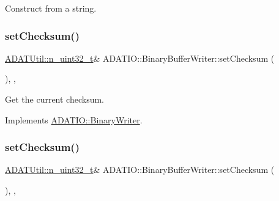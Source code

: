 Construct from a string. 

\mbox{\label{classADATIO_1_1BinaryBufferWriter_af4cc523a862ce29a96f1a813f254360e}} 
\subsubsection{\texorpdfstring{setChecksum()}{setChecksum()}\hspace{0.1cm}{\footnotesize\ttfamily [1/2]}}
{\footnotesize\ttfamily \mbox{\hyperlink{namespaceADATUtil_ad945a8afa4db2d1f89b731964adae97e}{A\+D\+A\+T\+Util\+::n\+\_\+uint32\+\_\+t}}\& A\+D\+A\+T\+I\+O\+::\+Binary\+Buffer\+Writer\+::set\+Checksum (\begin{DoxyParamCaption}{ }\end{DoxyParamCaption})\hspace{0.3cm}{\ttfamily [inline]}, {\ttfamily [protected]}, {\ttfamily [virtual]}}



Get the current checksum. 



Implements \mbox{\hyperlink{classADATIO_1_1BinaryWriter_ae64230370824192d1f0dbcaa8e74017a}{A\+D\+A\+T\+I\+O\+::\+Binary\+Writer}}.

\mbox{\label{classADATIO_1_1BinaryBufferWriter_af4cc523a862ce29a96f1a813f254360e}} 
\subsubsection{\texorpdfstring{setChecksum()}{setChecksum()}\hspace{0.1cm}{\footnotesize\ttfamily [2/2]}}
{\footnotesize\ttfamily \mbox{\hyperlink{namespaceADATUtil_ad945a8afa4db2d1f89b731964adae97e}{A\+D\+A\+T\+Util\+::n\+\_\+uint32\+\_\+t}}\& A\+D\+A\+T\+I\+O\+::\+Binary\+Buffer\+Writer\+::set\+Checksum (\begin{DoxyParamCaption}{ }\end{DoxyParamCaption})\hspace{0.3cm}{\ttfamily [inline]}, {\ttfamily [protected]}, {\ttfamily [virtual]}}



